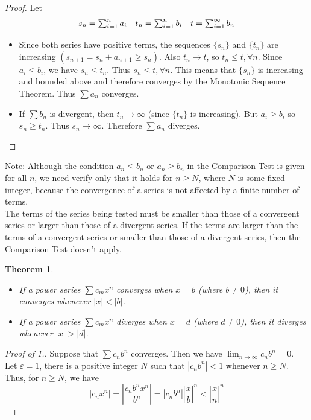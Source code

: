 \documentclass[10pt]{report}
\newtheorem{thm2}{Theorem}[section]
\newcommand{\eps}{\varepsilon}
\begin{document}
\begin{proof}
Let
$$\begin{array}{c c c} 
s_n = \sum_{i=1}^n a_i & t_n = \sum_{i=1}^n b_i & t = \sum_{i=1}^\infty b_n
\end{array}$$
\begin{itemize}
\item[(i)] Since both series have positive terms, the sequences $\{s_n\}$ and $\{t_n\}$ are increasing $(s_{n+1} = s_n + a_{n+1} \geq s_n)$. Also $t_n\to t$, so $t_n \leq t, \forall n$. Since $a_i \leq b_i$, we have $s_n\leq t_n$. Thus $s_n\leq t, \forall n$. This means that $\{s_n\}$ is increasing and bounded above and therefore converges by the Monotonic Sequence Theorem. Thus $\sum a_n$ converges.
\item[(ii)] If $\sum b_n$ is divergent, then $t_n \to \infty$ (since $\{t_n\}$ is increasing). But $a_i \geq b_i$ so $s_n\geq t_n$. Thus $s_n\to \infty$. Therefore $\sum a_n$ diverges.
\end{itemize}
\end{proof}
Note: Although the condition $a_n\leq b_n$ or $a_n\geq b_n$ in the Comparison Test is given for all $n$, we need verify only that it holds for $n\geq N$, where $N$ is some fixed integer, because the convergence of a series is not affected by a finite number of terms.\\
The terms of the series being tested must be smaller than those of a convergent series or larger than those of a divergent series. If the terms are larger than the terms of a convergent series or smaller than those of a divergent series, then the Comparison Test doesn't apply.
\begin{thm2}
\begin{itemize}
\item[1.] If a power series $\sum c_mx^n$ converges when $x=b$ (where $b\neq 0$), then it converges whenever $|x| < |b|$.
\item[2.] If a power series $\sum c_mx^n$ diverges when $x=d$ (where $d\neq 0$), then it diverges whenever $|x| > |d|$.
\end{itemize}
\end{thm2}
\begin{proof}[Proof of 1.]
Suppose that $\sum c_nb^n$ converges. Then we have $\lim_{n\to \infty} c_nb^n =0$. Let $\eps=1$, there is a positive integer $N$ such that $|c_nb^n|<1$ whenever $n\geq N$. Thus, for $n\geq N$, we have
$$|c_nx^n| = \left| \frac{c_nb^nx^n}{b^n}\right| = |c_nb^n|\left|\frac{x}{b}\right|^n <\left|\frac{x}{n}\right|^n $$
\end{proof}
\end{document}

